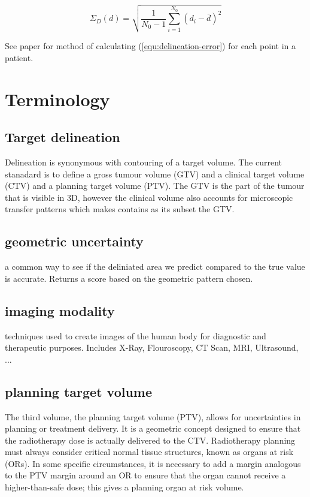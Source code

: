 \documentclass[11pt]{article}
\begin{document}
\begin{equation}
    \Sigma_D(d) = \sqrt{\frac{1}{N_0-1}\sum^{N_0}_{i=1}{(d_i - \bar d)^2}} \label{equ:delineation-error}
\end{equation}

See paper for method of calculating (\ref{equ:delineation-error}) for each point in a patient.

\section{Terminology}

\subsection{Target delineation} \label{term:target-delineation}

Delineation is synonymous with contouring of a target volume. The current stanadard is to define a gross tumour volume (GTV) and a clinical target volume (CTV) and a planning target volume (PTV). The GTV is the part of the tumour that is visible in 3D, however the clinical volume also accounts for microscopic transfer patterns which makes contains as its subset the GTV\cite{tumor-delineation}.

\subsection{geometric uncertainty} \label{term:geometric-uncertainty}

a common way to see if the deliniated area we predict compared to the true value is accurate. Returns a score based on the geometric pattern chosen\cite{review-metrics}.

\subsection{imaging modality} \label{term:imaging-modality}

techniques used to create images of the human body for diagnostic and therapeutic purposes. Includes X-Ray, Flouroscopy, CT Scan, MRI, Ultrasound, ...\cite{imaging-modality}

\subsection{planning target volume} \label{term:planning-target-volume}

The third volume, the planning target volume (PTV), allows for uncertainties in planning or treatment delivery. It is a geometric concept designed to ensure that the radiotherapy dose is actually delivered to the CTV. Radiotherapy planning must always consider critical normal tissue structures, known as organs at risk (ORs). In some specific circumstances, it is necessary to add a margin analogous to the PTV margin around an OR to ensure that the organ cannot receive a higher-than-safe dose; this gives a planning organ at risk volume. \cite{defining-target-volumes}

\printbibliography
\end{document}
